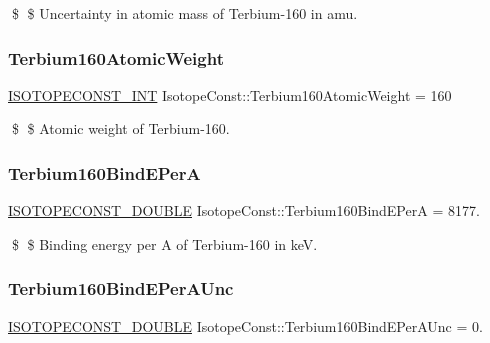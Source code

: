 \$ \$ Uncertainty in atomic mass of Terbium-\/160 in amu. \mbox{\label{group___isotope_const-_terbium-_tb160_gafd3d56c9b8c092c68b61b9749023f80b}} 
\subsubsection{\texorpdfstring{Terbium160\+Atomic\+Weight}{Terbium160AtomicWeight}}
{\footnotesize\ttfamily \mbox{\hyperlink{group___isotope_const-_macros_ga5f18360b3e99483a35c32d789e62621c}{I\+S\+O\+T\+O\+P\+E\+C\+O\+N\+S\+T\+\_\+\+I\+NT}} Isotope\+Const\+::\+Terbium160\+Atomic\+Weight = 160}

\$ \$ Atomic weight of Terbium-\/160. \mbox{\label{group___isotope_const-_terbium-_tb160_gad8f172508f3498d27c53bdefd095f3fb}} 
\subsubsection{\texorpdfstring{Terbium160\+Bind\+E\+PerA}{Terbium160BindEPerA}}
{\footnotesize\ttfamily \mbox{\hyperlink{group___isotope_const-_macros_ga8f45a7272ce02c0b4c65c44636ed719a}{I\+S\+O\+T\+O\+P\+E\+C\+O\+N\+S\+T\+\_\+\+D\+O\+U\+B\+LE}} Isotope\+Const\+::\+Terbium160\+Bind\+E\+PerA = 8177.}

\$ \$ Binding energy per A of Terbium-\/160 in keV. \mbox{\label{group___isotope_const-_terbium-_tb160_gaef35ab807f6136adf162ca932f317b76}} 
\subsubsection{\texorpdfstring{Terbium160\+Bind\+E\+Per\+A\+Unc}{Terbium160BindEPerAUnc}}
{\footnotesize\ttfamily \mbox{\hyperlink{group___isotope_const-_macros_ga8f45a7272ce02c0b4c65c44636ed719a}{I\+S\+O\+T\+O\+P\+E\+C\+O\+N\+S\+T\+\_\+\+D\+O\+U\+B\+LE}} Isotope\+Const\+::\+Terbium160\+Bind\+E\+Per\+A\+Unc = 0.}

